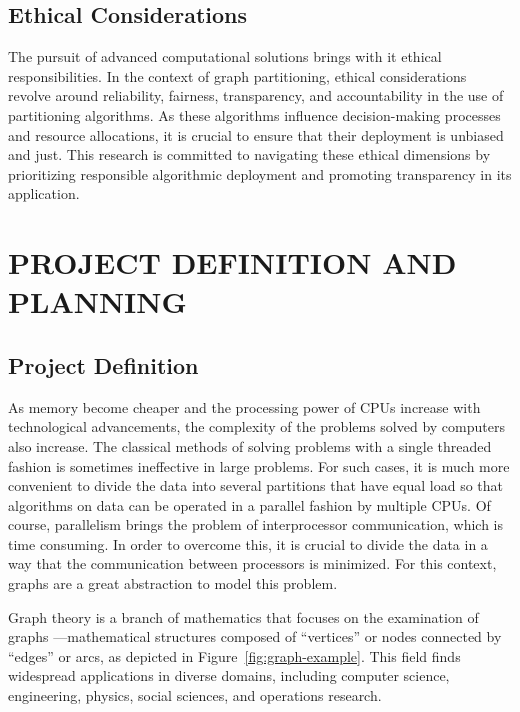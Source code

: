 \documentclass[a4paper,12pt]{report}
\begin{document}
\section{Ethical Considerations}

The pursuit of advanced computational solutions brings with it ethical responsibilities. In the context of graph partitioning, ethical considerations revolve around reliability, fairness, transparency, and accountability in the use of partitioning algorithms. As these algorithms influence decision-making processes and resource allocations, it is crucial to ensure that their deployment is unbiased and just. This research is committed to navigating these ethical dimensions by prioritizing responsible algorithmic deployment and promoting transparency in its application.

\chapter{PROJECT DEFINITION AND PLANNING}
\section{Project Definition}

As memory become cheaper and the processing power of CPUs increase with technological advancements, the complexity of the problems solved by computers also increase. The classical methods of solving problems with a single threaded fashion is sometimes ineffective in large problems. For such cases, it is much more convenient to divide the data into several partitions that have equal load so that algorithms on data can be operated in a parallel fashion by multiple CPUs. Of course, parallelism brings the problem of interprocessor communication, which is time consuming. In order to overcome this, it is crucial to divide the data in a way that the communication between processors is minimized. For this context, graphs are a great abstraction to model this problem.

Graph theory is a branch of mathematics that focuses on the examination of graphs —mathematical structures composed of ``vertices'' or nodes connected by ``edges'' or arcs, as depicted in Figure~\ref{fig:graph-example}. This field finds widespread applications in diverse domains, including computer science, engineering, physics, social sciences, and operations research.
\end{document}

